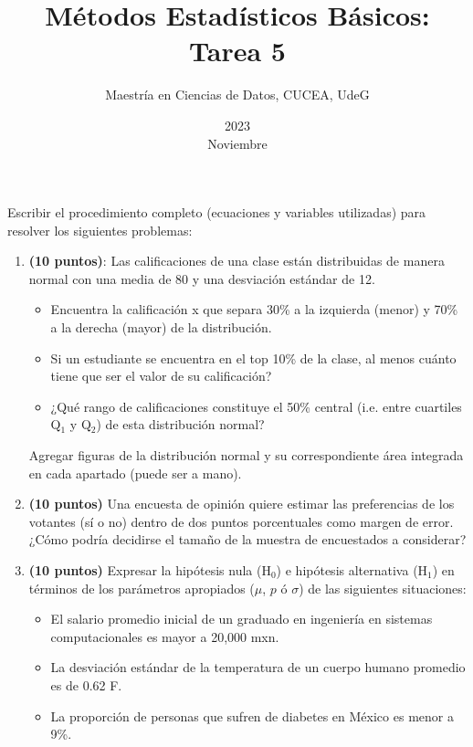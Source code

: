 \documentclass{article}
\title{Métodos Estadísticos Básicos: Tarea 5}
\date{2023\\ Noviembre}
\author{Maestría en Ciencias de Datos, CUCEA, UdeG}
\begin{document}
  
\maketitle
  
  

  

\noindent Escribir el procedimiento completo (ecuaciones y variables utilizadas) para resolver los siguientes problemas:

\begin{enumerate}

\item \textbf{(10 puntos)}:  Las calificaciones de una clase están distribuidas de manera normal con una media de 80 y una desviación estándar de 12. 

\begin{itemize}
\item Encuentra la calificación x que separa 30\% a la izquierda (menor) y 70\% a la derecha (mayor) de la distribución. 
\item Si un estudiante se encuentra en el top 10\% de la clase, al menos cuánto tiene que ser el valor de su calificación?
\item ¿Qué rango de calificaciones constituye el 50\% central (i.e. entre cuartiles Q$_1$ y Q$_2$) de esta distribución normal?
\end{itemize}

Agregar figuras de la distribución normal y su correspondiente área integrada en cada apartado (puede ser a mano).

\item \textbf{(10 puntos)} Una encuesta de opinión quiere estimar las preferencias de los votantes (sí o no) dentro de dos puntos porcentuales como margen de error. ¿Cómo podría decidirse el tamaño de la muestra de encuestados a considerar?


\item \textbf{(10 puntos)} Expresar la hipótesis nula (H$_0$) e hipótesis alternativa (H$_1$) en términos de los parámetros apropiados ($\mu$, $p$ ó $\sigma$) de las siguientes situaciones:

\begin{itemize}
\item El salario promedio inicial de un graduado en ingeniería en sistemas computacionales es mayor a 20,000 mxn.
\item La desviación estándar de la temperatura de un cuerpo humano promedio es de 0.62 F.
\item La proporción de personas que sufren de diabetes en México es menor a 9\%.
\end{itemize}



\end{enumerate}
\end{document}
